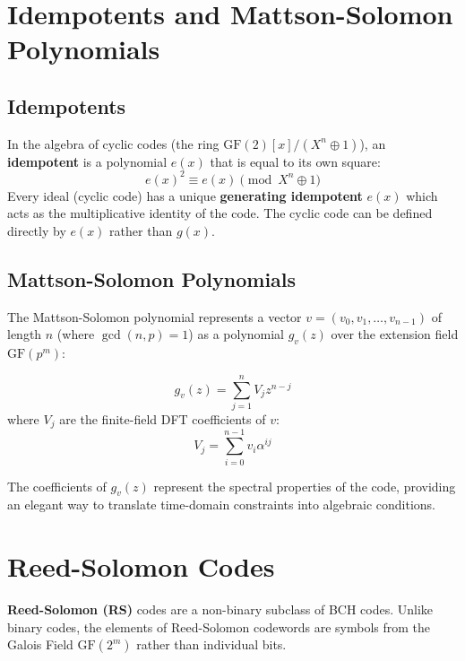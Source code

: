 \documentclass[12pt,a4paper]{article}
\begin{document}
\section{Idempotents and Mattson-Solomon Polynomials}

\subsection{Idempotents}
In the algebra of cyclic codes (the ring $\text{GF}(2)[x] / (X^n \oplus 1)$), an \textbf{idempotent} is a polynomial $e(x)$ that is equal to its own square:
\[ e(x)^2 \equiv e(x) \pmod{X^n \oplus 1} \]
Every ideal (cyclic code) has a unique \textbf{generating idempotent} $e(x)$ which acts as the multiplicative identity of the code. The cyclic code can be defined directly by $e(x)$ rather than $g(x)$.

\subsection{Mattson-Solomon Polynomials}
The Mattson-Solomon polynomial represents a vector $v = (v_0, v_1, \dots, v_{n-1})$ of length $n$ (where $\gcd(n, p) = 1$) as a polynomial $g_v(z)$ over the extension field $\text{GF}(p^m)$:
\begin{tcolorbox}[defbox, title={\textbf{Mattson-Solomon Polynomial Definition}}]
\[ g_v(z) = \sum_{j=1}^n V_j z^{n-j} \]
where $V_j$ are the finite-field DFT coefficients of $v$:
\[ V_j = \sum_{i=0}^{n-1} v_i \alpha^{ij} \]
\end{tcolorbox}
The coefficients of $g_v(z)$ represent the spectral properties of the code, providing an elegant way to translate time-domain constraints into algebraic conditions.

\section{Reed-Solomon Codes}

\textbf{Reed-Solomon (RS)} codes are a non-binary subclass of BCH codes. Unlike binary codes, the elements of Reed-Solomon codewords are symbols from the Galois Field $\text{GF}(2^m)$ rather than individual bits.
\end{document}
